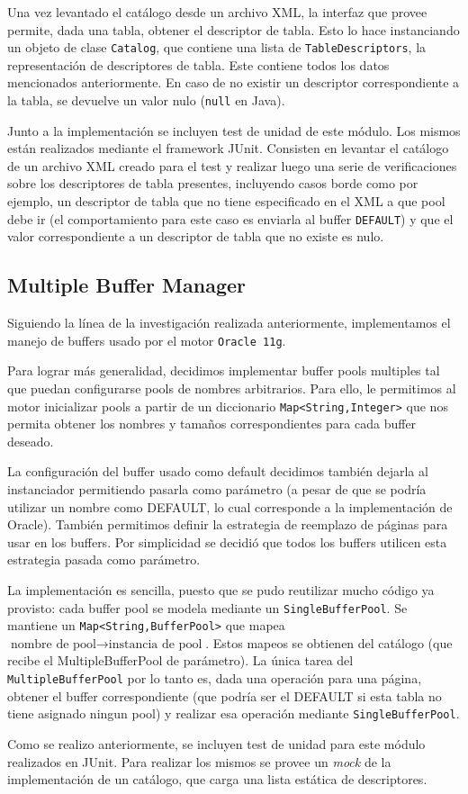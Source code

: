 Una vez levantado el cat\'alogo desde un archivo XML, la interfaz que provee permite, dada una tabla, obtener el descriptor de tabla. Esto lo hace instanciando un objeto de clase \texttt{Catalog}, que contiene una lista de \texttt{TableDescriptors}, la representaci\'on de descriptores de tabla. Este contiene todos los datos mencionados anteriormente. En caso de no existir un descriptor correspondiente a la tabla, se devuelve un valor nulo (\texttt{null} en Java).

Junto a la implementaci\'on se incluyen test de unidad de este m\'odulo. Los mismos est\'an realizados mediante el framework JUnit. Consisten en levantar el cat\'alogo
de un archivo XML creado para el test y realizar luego una serie de verificaciones sobre los descriptores de tabla presentes, incluyendo casos borde como por ejemplo, un
descriptor de tabla que no tiene especificado en el XML a que pool debe ir (el comportamiento para este caso es enviarla al buffer \texttt{DEFAULT}) y que el valor correspondiente a un descriptor de tabla que no existe es nulo.

\subsection{Multiple Buffer Manager}

Siguiendo la l\'inea de la investigaci\'on realizada anteriormente, implementamos el manejo de buffers usado por el motor \texttt{Oracle 11g}.

Para lograr m\'as generalidad, decidimos implementar buffer pools multiples tal que puedan configurarse pools de nombres arbitrarios. Para ello, le permitimos al motor
inicializar pools a partir de un diccionario \texttt{Map<String,Integer>} que nos permita obtener los nombres y tama\~nos correspondientes para cada buffer deseado.

La configuraci\'on del buffer usado como default decidimos tambi\'en dejarla al instanciador permitiendo pasarla como par\'ametro (a pesar de que se podr\'ia utilizar un nombre como DEFAULT, lo cual corresponde a la implementaci\'on de Oracle). Tambi\'en permitimos definir la estrategia de reemplazo de p\'aginas para usar en los buffers. Por simplicidad se decidi\'o que todos los buffers utilicen esta estrategia pasada como par\'ametro.

La implementaci\'on es sencilla, puesto que se pudo reutilizar mucho c\'odigo ya provisto: cada buffer pool se modela mediante un \texttt{SingleBufferPool}. Se mantiene
un \texttt{Map<String,BufferPool>} que mapea $\text{nombre de pool} \rightarrow \text{instancia de pool}$. Estos mapeos se obtienen del cat\'alogo (que recibe el MultipleBufferPool de par\'ametro). La \'unica tarea del \texttt{MultipleBufferPool} por lo tanto es, dada una operaci\'on para una p\'agina, obtener el buffer correspondiente (que podría ser el DEFAULT si esta tabla no tiene asignado ningun pool) y realizar esa operaci\'on mediante \texttt{SingleBufferPool}.

Como se realizo anteriormente, se incluyen test de unidad para este m\'odulo realizados en JUnit. Para realizar los mismos se provee un \textit{mock} de la implementaci\'on de un cat\'alogo, que carga una lista est\'atica de descriptores.

